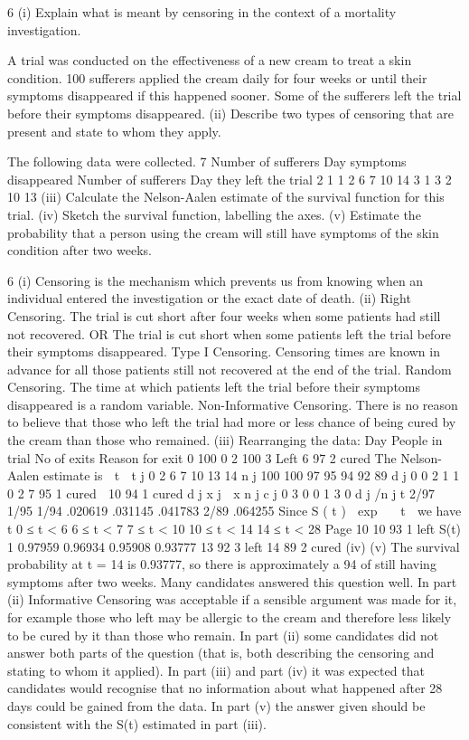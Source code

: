 6
(i)
Explain what is meant by censoring in the context of a mortality investigation.

A trial was conducted on the effectiveness of a new cream to treat a skin condition.
100 sufferers applied the cream daily for four weeks or until their symptoms
disappeared if this happened sooner. Some of the sufferers left the trial before their
symptoms disappeared.
(ii)
Describe two types of censoring that are present and state to whom they apply.

The following data were collected.
7
Number of
sufferers Day symptoms
disappeared Number of
sufferers Day they left
the trial
2
1
1
2 6
7
10
14 3
1
3 2
10
13
(iii) Calculate the Nelson-Aalen estimate of the survival function for this trial. 
(iv) Sketch the survival function, labelling the axes.
(v) Estimate the probability that a person using the cream will still have symptoms
of the skin condition after two weeks.


6
(i) Censoring is the mechanism which prevents us from knowing when an individual
entered the investigation or the exact date of death.
(ii) Right Censoring. The trial is cut short after four weeks when some patients had still
not recovered.
OR
The trial is cut short when some patients left the trial before their symptoms
disappeared.
Type I Censoring. Censoring times are known in advance for all those patients still
not recovered at the end of the trial.
Random Censoring. The time at which patients left the trial before their symptoms
disappeared is a random variable.
Non-Informative Censoring. There is no reason to believe that those who left the trial
had more or less chance of being cured by the cream than those who remained.
(iii)
Rearranging the data:
Day
People in trial
No of exits
Reason for exit
0
100
0
2
100
3
Left
6
97
2
cured
The Nelson-Aalen estimate is  t 
t j
0
2
6
7
10
13
14
n j
100
100
97
95
94
92
89
d j
0
0
2
1
1
0
2
7
95
1
cured

10
94
1
cured
d j
x j  x
n j
c j
0
3
0
0
1
3
0
d j /n j \lambda t
2/97
1/95
1/94 .020619
.031145
.041783
2/89 .064255
Since S ( t )  exp   t  we have
t
0 ≤ t < 6
6 ≤ t < 7
7 ≤ t < 10
10 ≤ t < 14
14 ≤ t < 28
Page 10
10
93
1
left
S(t)
1
0.97959
0.96934
0.95908
0.93777
13
92
3
left
14
89
2
cured%
(iv)
(v)
The survival probability at t = 14 is 0.93777, so there is approximately a 94%
of still having symptoms after two weeks.
Many candidates answered this question well. In part (ii) Informative Censoring was
acceptable if a sensible argument was made for it, for example those who left may be allergic
to the cream and therefore less likely to be cured by it than those who remain. In part (ii)
some candidates did not answer both parts of the question (that is, both describing the
censoring and stating to whom it applied). In part (iii) and part (iv) it was expected that
candidates would recognise that no information about what happened after 28 days could be
gained from the data. In part (v) the answer given should be consistent with the S(t) estimated
in part (iii).

